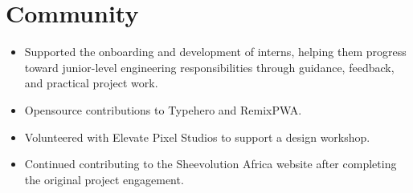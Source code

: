 \documentclass[letterpaper,11pt]{article}
\newcommand{\resumeItem}[1]{
  \item\small{
    {#1 \vspace{-2pt}}
  }
}
\newcommand{\resumeItemListStart}{\begin{itemize}[label=$\vcenter{\hbox{\tiny$\bullet$}}$]}
\newcommand{\resumeItemListEnd}{\end{itemize}\vspace{-5pt}}
\begin{document}
\section{Community}
 \resumeItemListStart
     \resumeItem{Supported the onboarding and development of interns, helping them progress toward junior-level engineering responsibilities through guidance, feedback, and practical project work.}
     \resumeItem{Opensource contributions to Typehero and RemixPWA.}
     \resumeItem{Volunteered with Elevate Pixel Studios to support a design workshop.}
     \resumeItem{Continued contributing to the Sheevolution Africa website after completing the original project engagement.}
    \resumeItemListEnd


\end{document}
